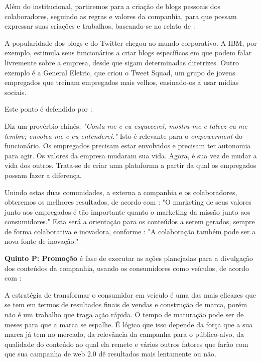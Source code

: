 Além do institucional, partiremos para a criação de blogs pessoais dos colaboradores, seguindo as regras e valores da companhia, para que possam expressar suas criações e trabalhos, baseando-se no relato de :

\begin{citacao}
A popularidade dos blogs e do Twitter chegou ao mundo corporativo. A IBM, por exemplo, estimula seus funcionários a criar blogs específicos em que podem falar livremente sobre a empresa, desde que sigam determinadas diretrizes. Outro exemplo é a General Eletric, que criou o Tweet Squad, um grupo de jovens empregados que treinam empregados mais velhos, ensinado-os a usar mídias sociais.
\end{citacao}

Este ponto é defendido por :

\begin{citacao}
Diz um provérbio chinês: \emph{"Conta-me e eu esquecerei, mostra-me e talvez eu me lembre; envolva-me e eu entenderei."} Isto é relevante para o \textit{empowerment} do funcionário. Os empregados precisam estar envolvidos e precisam ter autonomia para agir. Os valores da empresa mudaram sua vida. Agora, é sua vez de mudar a vida dos outros. Trata-se de criar uma plataforma a partir da qual os empregados possam fazer a diferença.
\end{citacao}

Unindo estas duas comunidades, a externa a companhia e os colaboradores, obteremos os melhores resultados, de acordo com : "O marketing de seus valores junto aos empregados é tão importante quanto o marketing da missão junto aos consumidores."  Esta será a orientação para os conteúdos a serem gerados, sempre de forma colaborativa e inovadora, conforme  : "A colaboração também pode ser a nova fonte de inovação."

\textbf{Quinto P: Promoção} é fase de executar as ações planejadas para a divulgação dos conteúdos da companhia, usando os consumidores como veículos, de acordo com :

\begin{citacao}
A estratégia de transformar o consumidor em veículo é uma das mais eficazes que se tem em termos de resultados finais de vendas e construção de marca, porém
não é um trabalho que traga ação rápida. O tempo de maturação pode ser de meses para que a marca se espalhe. É lógico que isso depende da força que a sua marca
já tem no mercado, da relevância da campanha para o público-alvo, da qualidade do conteúdo ao qual ela remete e vários outros fatores que farão com que sua
campanha de web 2.0 dê resultados mais lentamente ou não.
\end{citacao}

